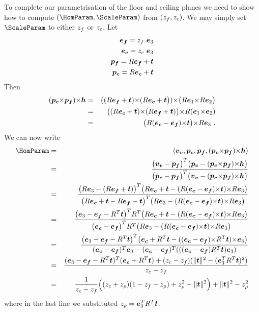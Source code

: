 To complete our parametrisation of the floor and ceiling planes we
need to show how to compute $(\HomParam,\ScaleParam)$ from
$(\zfloor,\zceil)$. We may simply set $\ScaleParam$ to either
$\zfloor$ or $\zceil$. Let
\begin{eqnarray}
  \efloor = \zfloor ~ \ez \\
  \eceil = \zceil ~ \ez \\
  \pfloor = \RetProj{\efloor} \\
  \pceil = \RetProj{\eceil}
\end{eqnarray}
Then
\begin{eqnarray}
  (\pceil \cross \pfloor) \cross \horizon &=&
    \bigl((\RetProj{\efloor}) \cross (\RetProj{\eceil}\bigr))
    \cross
    \bigl(\CamR\ex \cross
          \CamR\ey \bigr)\\
  &=& \bigl( (\RetProj{\eceil}) \cross (\RetProj{\efloor}) \bigr)
      \cross
      \CamR(\ex\cross\ey) \\
  &=& \bigl( \CamR(\eceil-\efloor)\cross\CamTr \bigr)
      \cross
      \CamR\ez ~.
\end{eqnarray}
We can now write
\begin{eqnarray}
  \HomParam &=& 
    \langle\vvpt,\pceil,\pfloor,(\pceil\cross\pfloor)\cross\horizon\rangle \\
  &=& \frac{
    \bigl(\vvpt-\pfloor\bigr)^T
    \bigl(\pceil-(\pceil\cross\pfloor)\cross\horizon\bigr)
   }{
    \bigl(\pceil-\pfloor\bigr)^T
    \bigl(\vvpt-(\pceil\cross\pfloor)\cross\horizon\bigr)
   }\\
  &=& \frac{
    \bigl(\CamR\ez - (\CamR\efloor+\CamTr)\bigr)^T
    \bigl(\CamR\eceil+\CamTr-
          (\CamR(\eceil-\efloor)\cross\CamTr)\cross\CamR\ez
          \bigr)
   }{
    \bigl(\CamR\eceil+\CamTr-\CamR\efloor-\CamTr\bigr)^T
    \bigl(\CamR\ez-
          (\CamR(\eceil-\efloor)\cross\CamTr)\cross\CamR\ez
          \bigr)
   }\\
  &=& \frac{
    \bigl(\ez - \efloor - \CamR^T\CamTr\bigr)^T R^T
    \bigl(\CamR\eceil+\CamTr-
          (\CamR(\eceil-\efloor)\cross\CamTr)\cross\CamR\ez
          \bigr)
   }{
    \bigl(\eceil-\efloor\bigr)^T R^T
    \bigl(\CamR\ez-
          (\CamR(\eceil-\efloor)\cross\CamTr)\cross\CamR\ez
          \bigr)
   }\\
  &=& \frac{
    \bigl(\ez - \efloor - \CamR^T\CamTr\bigr)^T
    \bigl(\eceil + \CamR^T\CamTr -
          ((\eceil-\efloor)\cross\CamR^T\CamTr)\cross\ez
          \bigr)
   }{
    (\eceil-\efloor)^T\ez -
    (\eceil-\efloor)^T(((\eceil-\efloor)\CamR^T\CamTr)\ez)
   }\\
  &=& \frac{
    (\ez-\efloor-\CamR^T\CamTr)^T(\eceil+\CamR^T\CamTr)
    +(\zceil-\zfloor)(\|\CamTr\|^2 - (\ez^T\CamR^T\CamTr)^2)
   }{
    \zceil-\zfloor
   }\\
  &=& \frac{1}{\zceil-\zfloor}
    \Bigl( (\zceil + \zcam)(1-\zfloor-\zcam) + \zcam^2 - \|\CamTr\|^2 \Bigr)
     + \|\CamTr\|^2 - \zcam^2
\end{eqnarray}
where in the last line we substituted $\zcam =
\ez^T\CamR^T\CamTr$.

